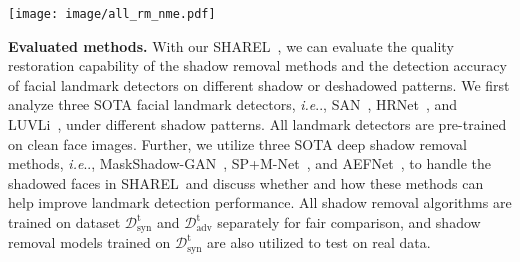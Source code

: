 \documentclass[10pt,twocolumn,letterpaper]{article}
\makeatletter
\def\ourmethod{{SHAREL}~}
\DeclareRobustCommand\onedot{\futurelet\@let@token\@onedot}
\def\@onedot{\ifx\@let@token.\else.\null\fi\xspace}
\def\eg{\emph{e.g}\onedot} \def\Eg{\emph{E.g}\onedot}
\def\ie{\emph{i.e}\onedot} \def\Ie{\emph{I.e}\onedot}
\renewcommand{\paragraph}[1]{\vspace{1.25mm}\noindent\textbf{#1}}
\makeatother
\begin{document}
\begin{figure*}[t]
\centering
\texttt{[image: image/all\_rm\_nme.pdf]}
\caption{Shadow removal and landmark detection performance on \ourmethod.
(a-c): shadow removal (RMSE) and landmark detection (NME) results of $\{\mathcal{D}_\text{syn}, \mathcal{D}_\text{adv}, \mathcal{D}_\text{real}\}$ subsets, respectively. Each color represents results on shadow-free images (\eg, Clean+*), shadow images (\ie, Shadow+*), and shadow-removed images with four shadow removal methods (\eg, AEFNet/SP+M-Net/MaskShadow-GAN/Ours+*). Different icon shapes represent different landmark detectors.
(d-g): shadow pattern analysis of landmark detection (NME) and shadow removal (RMSE) results of $\mathcal{D}_\text{syn}$ for \textbf{intensity} (d), \textbf{size} (e), \textbf{shape} (f), and \textbf{location} (g). Blue dash line represents the result on clean images by the pre-trained landmark detector SAN \cite{dong2018style}.
Each group represents results on shadow images (\ie, Shadow), and shadow-removed images with two shadow removal methods (\eg, AEFNet/Ours). Each color represents a severity type. Relative performance gain, \ie, the percent of NME/RMSE drops, after shadow removal compared to shadow images is listed for AEFNet and Ours.
}
\label{fig:all_rm_ld}
\end{figure*}

\paragraph{Evaluated methods.}
%
With our \ourmethod, we can evaluate the quality restoration capability of the shadow removal methods and the detection accuracy of facial landmark detectors on different shadow or deshadowed patterns.
%
We first analyze three SOTA facial landmark detectors, \ie, SAN~\cite{dong2018style}, HRNet~\cite{wang2020deep}, and LUVLi~\cite{kumar2020luvli}, under different shadow patterns. All landmark detectors are pre-trained on clean face images. Further, we utilize three SOTA deep shadow removal methods, \ie, MaskShadow-GAN~\cite{hu2019mask}, SP+M-Net~\cite{le2019shadow}, and AEFNet~\cite{fu2021auto}, to handle the shadowed faces in \ourmethod and discuss whether and how these methods can help improve landmark detection performance. All shadow removal algorithms are trained on dataset $\mathcal{D}^\text{t}_\text{syn}$ and $\mathcal{D}^\text{t}_\text{adv}$ separately for fair comparison, and shadow removal models trained on $\mathcal{D}^\text{t}_\text{syn}$ are also utilized to test on real data.
\end{document}
